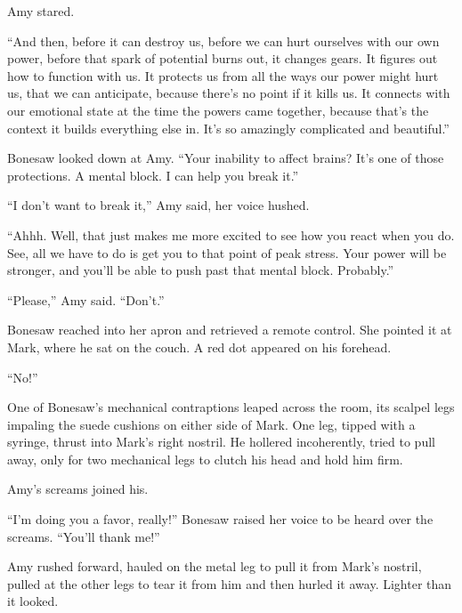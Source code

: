 Amy stared.



``And then, before it can destroy us, before we can hurt ourselves with our own power, before that spark of potential burns out, it changes gears.  It figures out how to function with us.  It protects us from all the ways our power might hurt us, that we can anticipate, because there's no point if it kills us.  It connects with our emotional state at the time the powers came together, because that's the context it builds everything else in.  It's so amazingly complicated and beautiful.''



Bonesaw looked down at Amy.  ``Your inability to affect brains?  It's one of those protections.  A mental block.  I can help you break it.''



``I don't want to break it,'' Amy said, her voice hushed.



``Ahhh.  Well, that just makes me more excited to see how you react when you do.  See, all we have to do is get you to that point of peak stress.  Your power will be stronger, and you'll be able to push past that mental block.  Probably.''



``Please,'' Amy said.  ``Don't.''



Bonesaw reached into her apron and retrieved a remote control.  She pointed it at Mark, where he sat on the couch.  A red dot appeared on his forehead.



``No!''



One of Bonesaw's mechanical contraptions leaped across the room, its scalpel legs impaling the suede cushions on either side of Mark.  One leg, tipped with a syringe, thrust into Mark's right nostril.  He hollered incoherently, tried to pull away, only for two mechanical legs to clutch his head and hold him firm.



Amy's screams joined his.



``I'm doing you a favor, really!''  Bonesaw raised her voice to be heard over the screams.  ``You'll thank me!''



Amy rushed forward, hauled on the metal leg to pull it from Mark's nostril, pulled at the other legs to tear it from him and then hurled it away.  Lighter than it looked.



